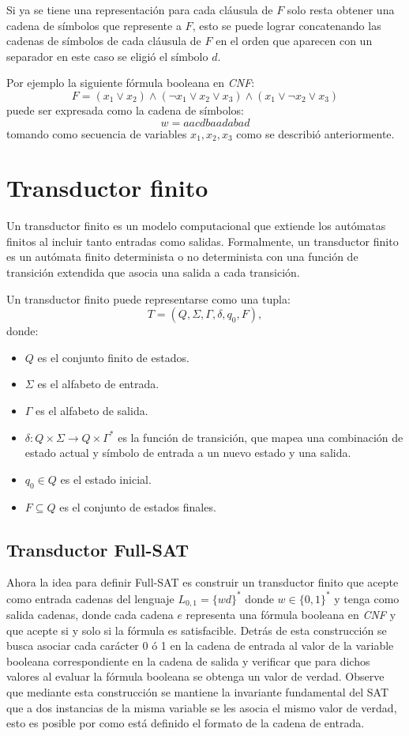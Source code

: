 \documentclass{article}
\begin{document}
Si ya se tiene una representación para cada cláusula de $F$ solo resta obtener una cadena de símbolos que represente a $F$,
esto se puede lograr concatenando las cadenas de símbolos de cada cláusula de $F$ en el orden que aparecen con un separador
en este caso se eligió el símbolo $d$.

Por ejemplo la siguiente fórmula booleana en \textit{CNF}:
$$F=(x_1 \vee x_2) \wedge (\neg x_1 \vee x_2 \vee x_3) \wedge (x_1 \vee \neg x_2 \vee x_3)$$
puede ser expresada como la cadena de símbolos:
$$w=aacdbaadabad$$
tomando como secuencia de variables $x_1, x_2, x_3$ como se describió anteriormente.

\section{Transductor finito}

Un transductor finito es un modelo computacional que extiende los autómatas finitos al incluir tanto entradas como salidas.
Formalmente, un transductor finito es un autómata finito determinista o no determinista con una función de transición extendida
que asocia una salida a cada transición.

Un transductor finito puede representarse como una tupla:
\[
    T = (Q, \Sigma, \Gamma, \delta, q_0, F),
\]
donde:
\begin{itemize}
    \item \(Q\) es el conjunto finito de estados.
    \item \(\Sigma\) es el alfabeto de entrada.
    \item \(\Gamma\) es el alfabeto de salida.
    \item \(\delta: Q \times \Sigma \to Q \times \Gamma^*\) es la función de transición, que mapea una combinación de estado actual y símbolo de entrada a un nuevo estado y una salida.
    \item \(q_0 \in Q\) es el estado inicial.
    \item \(F \subseteq Q\) es el conjunto de estados finales.
\end{itemize}

\subsection{Transductor Full-SAT}

Ahora la idea para definir Full-SAT es construir un transductor finito que acepte como entrada cadenas del lenguaje $L_{0,1}=\{wd\}^*$ donde $w\in \{0,1\}^*$
y tenga como salida cadenas, donde cada cadena $e$ representa una fórmula booleana en \textit{CNF} y que acepte si y solo si la fórmula es satisfacible. Detrás
de esta construcción se busca asociar cada carácter 0 ó 1 en la cadena de entrada al valor de la variable booleana correspondiente en la cadena de salida y verificar que para dichos
valores al evaluar la fórmula booleana se obtenga un valor de verdad. Observe que mediante esta construcción se mantiene la invariante fundamental del SAT que a dos instancias
de la misma variable se les asocia el mismo valor de verdad, esto es posible por como está definido el formato de la cadena de entrada.
\end{document}
